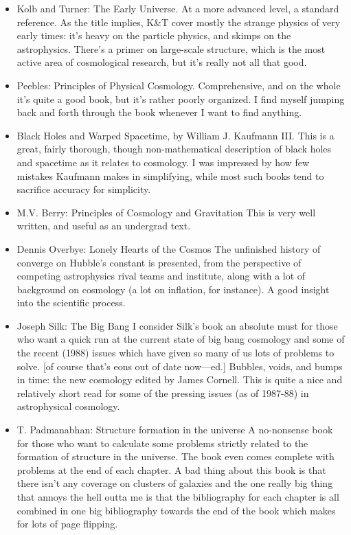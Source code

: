 \documentclass[10pt,a4paper]{book}
\theoremstyle{definition}
\begin{document}
\begin{itemize}
\item Kolb and Turner: The Early Universe.
At a more advanced level, a standard reference.  As the title implies, K\&T cover mostly the strange physics of very early times: it's heavy on the particle physics, and skimps on the astrophysics.  There's a primer on large-scale structure, which is the most active area of cosmological research, but it's really not all that good.
\item Peebles: Principles of Physical Cosmology. Comprehensive, and on the whole it's quite a good book, but it's rather poorly organized.  I find myself jumping back and forth through the book whenever I want to find anything.
\item Black Holes and Warped Spacetime, by William J. Kaufmann III.
This is a great, fairly thorough, though non-mathematical description of black holes and spacetime as it relates to cosmology.  I was impressed by how few mistakes Kaufmann makes in simplifying, while most such books tend to sacrifice accuracy for simplicity.
\item M.V. Berry: Principles of Cosmology and Gravitation
This is very well written, and useful as an undergrad text.
\item Dennis Overbye: Lonely Hearts of the Cosmos The unfinished history of converge on Hubble's constant is presented, from the perspective of competing astrophysics rival teams and institute, along with a lot of background on cosmology (a lot on inflation, for instance).  A good insight into the scientific process.
\item Joseph Silk: The Big Bang
I consider Silk's book an absolute must for those who want a quick run at the current state of big bang cosmology and some of the recent (1988) issues which have given so many of us lots of problems to solve.  [of course that's eons out of date now—ed.]
Bubbles, voids, and bumps in time: the new cosmology edited by James Cornell.
This is quite a nice and relatively short read for some of the pressing issues (as of 1987-88) in astrophysical cosmology.
\item T. Padmanabhan: Structure formation in the universe
A no-nonsense book for those who want to calculate some problems strictly related to the formation of structure in the universe.  The book even comes complete with problems at the end of each chapter.  A bad thing about this book is that there isn't any coverage on clusters of galaxies and the one really big thing that annoys the hell outta me is that the bibliography for each chapter is all combined in one big bibliography towards the end of the book which makes for lots of page flipping.

\end{itemize}
\end{document}
